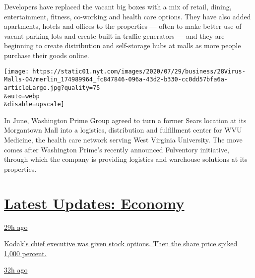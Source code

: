 Developers have replaced the vacant big boxes with a mix of retail,
dining, entertainment, fitness, co-working and health care options. They
have also added apartments, hotels and offices to the properties ---
often to make better use of vacant parking lots and create built-in
traffic generators --- and they are beginning to create distribution and
self-storage hubs at malls as more people purchase their goods online.

\texttt{[image: https://static01.nyt.com/images/2020/07/29/business/28Virus-Malls-04/merlin\_174989964\_fc847846-096a-43d2-b330-cc0dd57bfa6a-articleLarge.jpg?quality=75\\\&auto=webp\\\&disable=upscale]}

In June, Washington Prime Group agreed to turn a former Sears location
at its Morgantown Mall into a logistics, distribution and fulfillment
center for WVU Medicine, the health care network serving West Virginia
University. The move comes after Washington Prime's recently announced
Fulventory initiative, through which the company is providing logistics
and warehouse solutions at its properties.

\hypertarget{latest-updates-economy}{%
\section{\texorpdfstring{\href{https://www.nytimes.com/live/2020/07/31/business/stock-market-today-coronavirus?action=click\&pgtype=Article\&state=default\&region=MAIN_CONTENT_1\&context=storylines_live_updates}{Latest
Updates:
Economy}}{Latest Updates: Economy}}\label{latest-updates-economy}}

\href{https://www.nytimes.com/live/2020/07/31/business/stock-market-today-coronavirus?action=click\&pgtype=Article\&state=default\&region=MAIN_CONTENT_1\&context=storylines_live_updates\#kodaks-chief-executive-was-given-stock-options-then-the-share-price-spiked-1000-percent}{29h
ago}

\href{https://www.nytimes.com/live/2020/07/31/business/stock-market-today-coronavirus?action=click\&pgtype=Article\&state=default\&region=MAIN_CONTENT_1\&context=storylines_live_updates\#kodaks-chief-executive-was-given-stock-options-then-the-share-price-spiked-1000-percent}{Kodak's
chief executive was given stock options. Then the share price spiked
1,000 percent.}

\href{https://www.nytimes.com/live/2020/07/31/business/stock-market-today-coronavirus?action=click\&pgtype=Article\&state=default\&region=MAIN_CONTENT_1\&context=storylines_live_updates\#fitch-ratings-downgrades-its-outlook-on-us-debt}{32h
ago}

